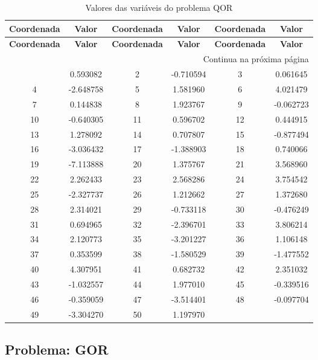 \documentclass[12pt]{article}
\begin{document}
\small
\begin{longtable}{@{}cc|cc|cc@{}}
\caption{Valores das variáveis do problema QOR} \\
\toprule
\textbf{Coordenada} & \textbf{Valor} & \textbf{Coordenada} & \textbf{Valor} & \textbf{Coordenada} & \textbf{Valor} \\
\midrule
\endfirsthead

\toprule
\textbf{Coordenada} & \textbf{Valor} & \textbf{Coordenada} & \textbf{Valor} & \textbf{Coordenada} & \textbf{Valor} \\
\midrule
\endhead

\midrule \multicolumn{6}{r}{{Continua na próxima página}} \\ \midrule
\endfoot

\bottomrule
\endlastfoot
1 & 0.593082 & 2 & -0.710594 & 3 & 0.061645 \\
4 & -2.648758 & 5 & 1.581960 & 6 & 4.021479 \\
7 & 0.144838 & 8 & 1.923767 & 9 & -0.062723 \\
10 & -0.640305 & 11 & 0.596702 & 12 & 0.444915 \\
13 & 1.278092 & 14 & 0.707807 & 15 & -0.877494 \\
16 & -3.036432 & 17 & -1.388903 & 18 & 0.740066 \\
19 & -7.113888 & 20 & 1.375767 & 21 & 3.568960 \\
22 & 2.262433 & 23 & 2.568286 & 24 & 3.754542 \\
25 & -2.327737 & 26 & 1.212662 & 27 & 1.372680 \\
28 & 2.314021 & 29 & -0.733118 & 30 & -0.476249 \\
31 & 0.694965 & 32 & -2.396701 & 33 & 3.806214 \\
34 & 2.120773 & 35 & -3.201227 & 36 & 1.106148 \\
37 & 0.353599 & 38 & -1.580529 & 39 & -1.477552 \\
40 & 4.307951 & 41 & 0.682732 & 42 & 2.351032 \\
43 & -1.032557 & 44 & 1.977010 & 45 & -0.339516 \\
46 & -0.359059 & 47 & -3.514401 & 48 & -0.097704 \\
49 & -3.304270 & 50 & 1.197970 &  &  \\

\end{longtable}


\newpage            
\subsection{Problema: GOR}
\end{document}
